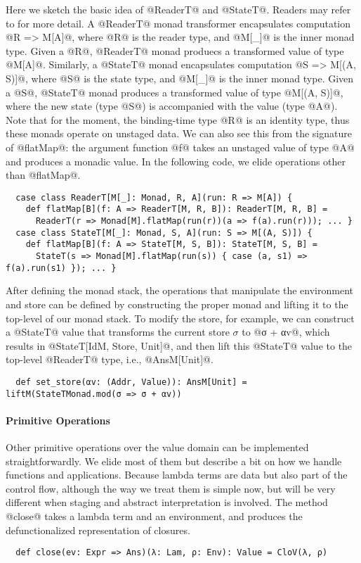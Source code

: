 Here we sketch the basic idea of @ReaderT@ and @StateT@. Readers may
refer to \cite{DBLP:conf/popl/LiangHJ95, Chiusano:2014:FPS:2688794} for more detail.
A @ReaderT@ monad transformer encapsulates computation @R => M[A]@, where
@R@ is the reader type, and @M[_]@ is the inner monad type.
Given a @R@, @ReaderT@ monad produecs a transformed value of type @M[A]@.
Similarly, a @StateT@ monad encapsulates computation @S => M[(A, S)]@, where
@S@ is the state type, and @M[_]@ is the inner monad type.
Given a @S@, @StateT@ monad produces a transformed value of type @M[(A, S)]@,
where the new state (type @S@) is accompanied with the value (type @A@).
Note that for the moment, the binding-time type @R@ is an identity type, thus
these monads operate on unstaged data. We can also see this from the
signature of @flatMap@: the argument function @f@ takes an unstaged value of type @A@ and
produces a monadic value. In the following code, we elide operations other than @flatMap@.
\begin{lstlisting}
  case class ReaderT[M[_]: Monad, R, A](run: R => M[A]) {
    def flatMap[B](f: A => ReaderT[M, R, B]): ReaderT[M, R, B] =
      ReaderT(r => Monad[M].flatMap(run(r))(a => f(a).run(r))); ... }
  case class StateT[M[_]: Monad, S, A](run: S => M[(A, S)]) {
    def flatMap[B](f: A => StateT[M, S, B]): StateT[M, S, B] =
      StateT(s => Monad[M].flatMap(run(s)) { case (a, s1) => f(a).run(s1) }); ... }
\end{lstlisting}

After defining the monad stack, the operations that manipulate the environment
and store can be defined by constructing the proper monad and lifting it to the
top-level of our monad stack. To modify the store, for example, we can construct a
@StateT@ value that transforms the current store $\sigma$ to @σ + αv@, which
results in @StateT[IdM, Store, Unit]@, and then lift this @StateT@ value to the
top-level @ReaderT@ type, i.e., @AnsM[Unit]@.
\begin{lstlisting}
  def set_store(αv: (Addr, Value)): AnsM[Unit] = liftM(StateTMonad.mod(σ => σ + αv))
\end{lstlisting}

\paragraph{Primitive Operations}
Other primitive operations over the value domain can be implemented
straightforwardly. We elide most of them but describe a bit on how we handle
functions and applications. Because lambda terms are data but also part of the
control flow, although the way we treat them is simple now, but will be very
different when staging and abstract interpretation is involved. The method
@close@ takes a lambda term and an environment, and produces the
defunctionalized representation of closures.
\begin{lstlisting}
  def close(ev: Expr => Ans)(λ: Lam, ρ: Env): Value = CloV(λ, ρ)
\end{lstlisting}

